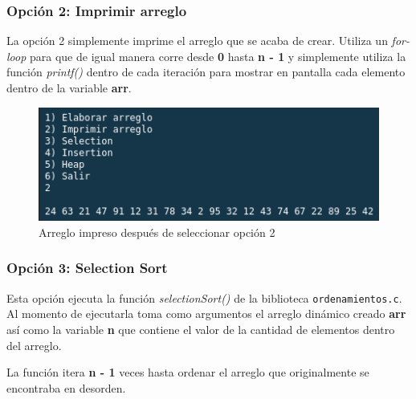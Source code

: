\documentclass{article}
\begin{document}
			\subsubsection{Opción 2: Imprimir arreglo}
			
			La opción 2 simplemente imprime el arreglo que se acaba de crear. Utiliza un \emph{for-loop} para que de igual manera corre desde \textbf{0} hasta \textbf{n - 1} y simplemente utiliza la función \emph{printf()} dentro de cada iteración para mostrar en pantalla cada elemento dentro de la variable \textbf{arr}.
			
			\begin{figure}[H]
				\centering
				\includegraphics[scale = 0.8]{images/e2-2}
				\caption{Arreglo impreso después de seleccionar opción 2}
			\end{figure}
			
			\subsubsection{Opción 3: Selection Sort}
			
			Esta opción ejecuta la función \emph{selectionSort()} de la biblioteca \verb*|ordenamientos.c|. Al momento de ejecutarla toma como argumentos el arreglo dinámico creado \textbf{arr} así como la variable \textbf{n} que contiene el valor de la cantidad de elementos dentro del arreglo.
			
			La función itera \textbf{n - 1} veces hasta ordenar el arreglo que originalmente se encontraba en desorden.
			
\end{document}
